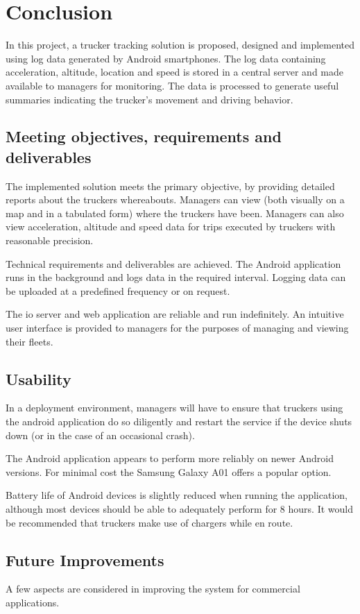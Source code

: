 \section{Conclusion}
In this project, a trucker tracking solution is proposed, designed and implemented using log data generated by Android smartphones. 
The log data containing acceleration, altitude, location and speed is stored in a central server and made available to managers for monitoring.
The data is processed to generate useful summaries indicating the trucker's movement and driving behavior.

\subsection{Meeting objectives, requirements and deliverables}
The implemented solution meets the primary objective, by providing detailed reports about the truckers whereabouts.
Managers can view (both visually on a map and in a tabulated form) where the truckers have been.
Managers can also view acceleration, altitude and speed data for trips executed by truckers with reasonable precision.

Technical requirements and deliverables are achieved.
The Android application runs in the background and logs data in the required interval.
Logging data can be uploaded at a predefined frequency or on request.

The \ac{io} server and web application are reliable and run indefinitely.
An intuitive user interface is provided to managers for the purposes of managing and viewing their fleets.

\subsection{Usability}
In a deployment environment, managers will have to ensure that truckers using the android application do so diligently and restart the service if the device shuts down (or in the case of an occasional crash).

The Android application appears to perform more reliably on newer Android versions.
For minimal cost the Samsung Galaxy A01 offers a popular option.

Battery life of Android devices is slightly reduced when running the application, although most devices should be able to adequately perform for 8 hours.
It would be recommended that truckers make use of chargers while en route.

\subsection{Future Improvements}
A few aspects are considered in improving the system for commercial applications.

